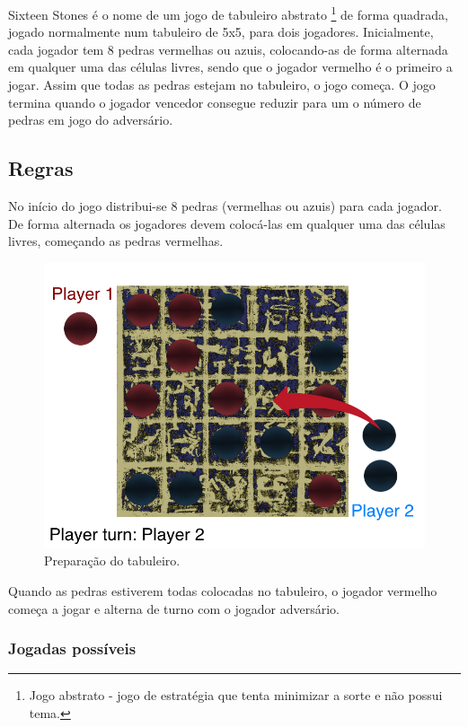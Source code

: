 \documentclass[a4paper]{article}
\begin{document}
Sixteen Stones é o nome de um jogo de tabuleiro abstrato \footnote{Jogo abstrato - jogo de estratégia que tenta minimizar a sorte e não possui tema.} de forma quadrada, jogado normalmente num tabuleiro de 5x5, para dois jogadores. Inicialmente, cada jogador tem 8 pedras vermelhas ou azuis, colocando-as de forma alternada em qualquer uma das células livres, sendo que o jogador vermelho é o primeiro a jogar. Assim que todas as pedras estejam no tabuleiro, o jogo começa. O jogo termina quando o jogador vencedor consegue reduzir para um o número de pedras em jogo do adversário.

\subsection{Regras}

No início do jogo distribui-se 8 pedras (vermelhas ou azuis) para cada jogador. De forma alternada os jogadores devem colocá-las em qualquer uma das células livres, começando as pedras vermelhas.

\begin{figure}[!htb]
\centering
\includegraphics[scale=0.3]{board_prep.png} 
\caption{Preparação do tabuleiro.}
\end{figure}

Quando as pedras estiverem todas colocadas no tabuleiro, o jogador vermelho começa a jogar e alterna de turno com o jogador adversário.

\subsubsection{Jogadas possíveis}
\end{document}
